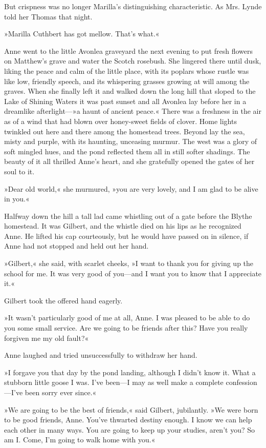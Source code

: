 But crispness was no longer Marilla’s distinguishing characteristic. As Mrs. Lynde told her Thomas that night.

»Marilla Cuthbert has got mellow. That’s what.«

Anne went to the little Avonlea graveyard the next evening to put fresh flowers on Matthew’s grave and water the Scotch rosebush. She lingered there until dusk, liking the peace and calm of the little place, with its poplars whose rustle was like low, friendly speech, and its whispering grasses growing at will among the graves. When she finally left it and walked down the long hill that sloped to the Lake of Shining Waters it was past sunset and all Avonlea lay before her in a dreamlike afterlight—»a haunt of ancient peace.« There was a freshness in the air as of a wind that had blown over honey-sweet fields of clover. Home lights twinkled out here and there among the homestead trees. Beyond lay the sea, misty and purple, with its haunting, unceasing murmur. The west was a glory of soft mingled hues, and the pond reflected them all in still softer shadings. The beauty of it all thrilled Anne’s heart, and she gratefully opened the gates of her soul to it.

»Dear old world,« she murmured, »you are very lovely, and I am glad to be alive in you.«

Halfway down the hill a tall lad came whistling out of a gate before the Blythe homestead. It was Gilbert, and the whistle died on his lips as he recognized Anne. He lifted his cap courteously, but he would have passed on in silence, if Anne had not stopped and held out her hand.

»Gilbert,« she said, with scarlet cheeks, »I want to thank you for giving up the school for me. It was very good of you—and I want you to know that I appreciate it.«

Gilbert took the offered hand eagerly.

»It wasn’t particularly good of me at all, Anne. I was pleased to be able to do you some small service. Are we going to be friends after this? Have you really forgiven me my old fault?«

Anne laughed and tried unsuccessfully to withdraw her hand.

»I forgave you that day by the pond landing, although I didn’t know it. What a stubborn little goose I was. I’ve been—I may as well make a complete confession—I’ve been sorry ever since.«

»We are going to be the best of friends,« said Gilbert, jubilantly. »We were born to be good friends, Anne. You’ve thwarted destiny enough. I know we can help each other in many ways. You are going to keep up your studies, aren’t you? So am I. Come, I’m going to walk home with you.«

